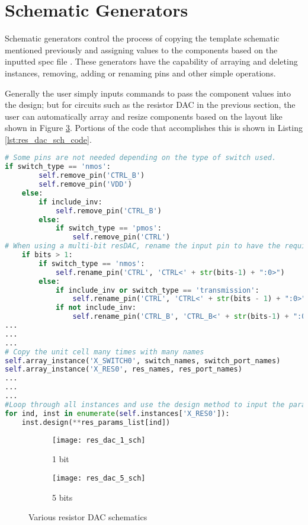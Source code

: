 \section{Schematic Generators}
Schematic generators control the process of copying the template schematic mentioned previously and assigning values to the components based on the inputted spec file \cite{chang_bag2:_2018}. These generators have the capability of arraying and deleting instances, removing, adding or renaming pins and other simple operations.

Generally the user simply inputs commands to pass the component values into the design; but for circuits such as the resistor DAC in the previous section, the user can automatically array and resize components based on the layout like shown in Figure \ref{fig:resdac_sch}. Portions of the code that accomplishes this is shown in Listing \ref{lst:res_dac_sch_code}.
\begin{lstlisting}[language=Python, caption=Resistor DAC schematic generator, label={lst:res_dac_sch_code}, float]
# Some pins are not needed depending on the type of switch used.
if switch_type == 'nmos':
        self.remove_pin('CTRL_B')
        self.remove_pin('VDD')
    else:
        if include_inv:
            self.remove_pin('CTRL_B')
        else:
            if switch_type == 'pmos':
                self.remove_pin('CTRL')
# When using a multi-bit resDAC, rename the input pin to have the required bitwidth.
    if bits > 1:
        if switch_type == 'nmos':
            self.rename_pin('CTRL', 'CTRL<' + str(bits-1) + ":0>")
        else:
            if include_inv or switch_type == 'transmission':
                self.rename_pin('CTRL', 'CTRL<' + str(bits - 1) + ":0>")
            if not include_inv:
                self.rename_pin('CTRL_B', 'CTRL_B<' + str(bits-1) + ":0>")
...
...
...
# Copy the unit cell many times with many names
self.array_instance('X_SWITCH0', switch_names, switch_port_names)
self.array_instance('X_RES0', res_names, res_port_names)
...
...
...
#Loop through all instances and use the design method to input the params from the spec file into the schematic
for ind, inst in enumerate(self.instances['X_RES0']):
	inst.design(**res_params_list[ind])
\end{lstlisting}
\clearpage
\begin{figure}[h]
\centering
\begin{subfigure}{.5\linewidth}
  \centering
  \texttt{[image: res\_dac\_1\_sch]}
  \caption{1 bit}
  \label{fig:sfig1}
\end{subfigure}
\begin{subfigure}{0.6\linewidth}
  \centering
\texttt{[image: res\_dac\_5\_sch]}
  \caption{5 bits}
  \label{fig:sfig2}
\end{subfigure}
\caption{Various resistor DAC schematics}
\label{fig:resdac_sch}
\end{figure}
\clearpage

